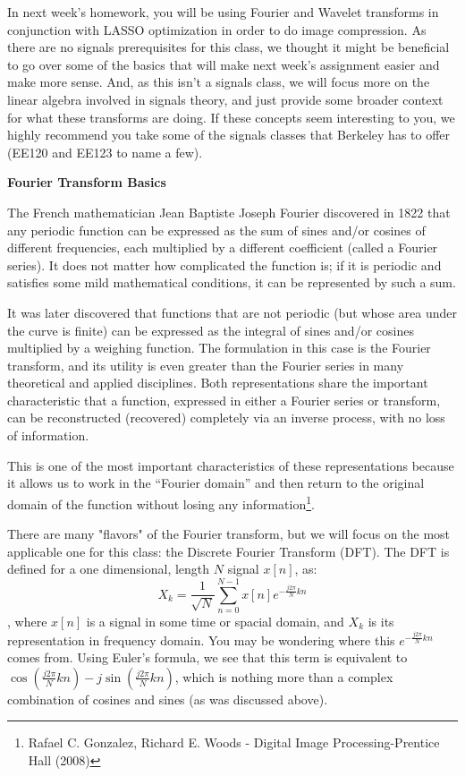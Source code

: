 
In next week's homework, you will be using Fourier and Wavelet transforms in conjunction with LASSO optimization in order to do image compression. As there are no signals prerequisites for this class, we thought it might be beneficial to go over some of the basics that will make next week's assignment easier and make more sense. And, as this isn't a signals class, we will focus more on the linear algebra involved in signals theory, and just provide some broader context for what these transforms are doing. If these concepts seem interesting to you, we highly recommend you take some of the signals classes that Berkeley has to offer (EE120 and EE123 to name a few).

\textbf{Fourier Transform Basics}

The French mathematician Jean Baptiste Joseph Fourier discovered in 1822 that any periodic function can be expressed as the sum of sines and/or cosines of different frequencies, each multiplied by a different coefficient (called a Fourier series). It does not matter how complicated the function is; if it is periodic and satisfies some mild mathematical conditions, it can be represented by such a sum.

It was later discovered that functions that are not periodic (but whose area under the curve is finite) can be expressed as the integral of sines and/or cosines multiplied by a weighing function. The formulation in this case is the Fourier transform, and its utility is even greater than the Fourier series in many theoretical and applied disciplines. Both representations share the important characteristic that a function, expressed in either a Fourier series or transform, can be reconstructed (recovered) completely via an inverse process, with no loss of information.

This is one of the most important characteristics of these representations because it allows us to work in the “Fourier domain” and then return to the original domain of the function without losing any information\footnote{Rafael C. Gonzalez, Richard E. Woods - Digital Image Processing-Prentice Hall (2008)}.

There are many "flavors" of the Fourier transform, but we will focus on the most applicable one for this class: the Discrete Fourier Transform (DFT). The DFT is defined for a one dimensional, length $N$ signal $x[n]$, as: $$X_k=\frac{1}{\sqrt{N}}\sum_{n=0}^{N-1}x[n]e^{-\frac{j2\pi}{N}kn}$$, where $x[n]$ is a signal in some time or spacial domain, and $X_k$ is its representation in frequency domain. You may be wondering where this $e^{-\frac{j2\pi}{N}kn}$ comes from. Using Euler's formula, we see that this term is equivalent to $\cos{(\frac{j2\pi}{N}kn)}-j\sin{(\frac{j2\pi}{N}kn)}$, which is nothing more than a complex combination of cosines and sines (as was discussed above).

